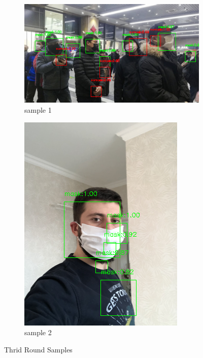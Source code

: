 \documentclass[10pt,a4paper]{report}
\begin{document}
\begin{figure}[hbtp]
     \centering
     \begin{subfigure}[b]{0.8\textwidth}
         \centering
         \includegraphics[width=\textwidth]{./imgs/r31.png}
         \caption{sample 1}
         \label{fig:Thrid round sample 1}
     \end{subfigure}
     \hfill
     \begin{subfigure}[b]{0.6\textwidth}
         \centering
         \includegraphics[width=\textwidth]{./imgs/r32.png}
         \caption{sample 2}
         \label{fig:Thrid round sample 2}
     \end{subfigure}

        \caption{Thrid Round Samples}
        \label{fig:f3}
\end{figure}
\end{document}
